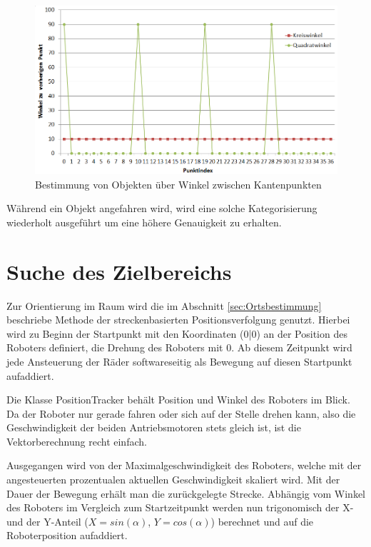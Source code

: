 \begin{figure}[h]
\centering
\includegraphics[width=\textwidth]{Bilder/Workloop/KreisQuadratWinkel}
\caption{Bestimmung von Objekten über Winkel zwischen Kantenpunkten}
\label{fig:KreisQuadratWinkel}
\end{figure}

Während ein Objekt angefahren wird, wird eine solche Kategorisierung wiederholt ausgeführt um eine höhere Genauigkeit zu erhalten.

\section{Suche des Zielbereichs}
\label{sec:Orientierung}

Zur Orientierung im Raum wird die im Abschnitt \ref{sec:Ortsbestimmung} beschriebe Methode der streckenbasierten Positionsverfolgung genutzt. Hierbei wird zu Beginn der Startpunkt mit den Koordinaten (0|0) an der Position des Roboters definiert, die Drehung des Roboters mit 0\degree. Ab diesem Zeitpunkt wird jede Ansteuerung der Räder  softwareseitig als Bewegung auf diesen Startpunkt aufaddiert. 

Die Klasse PositionTracker behält Position und Winkel des Roboters im Blick. Da der Roboter nur gerade fahren oder sich auf der Stelle drehen kann, also die Geschwindigkeit der beiden Antriebsmotoren stets gleich ist, ist die Vektorberechnung recht einfach.

Ausgegangen wird von der Maximalgeschwindigkeit des Roboters, welche mit der angesteuerten prozentualen aktuellen Geschwindigkeit skaliert wird. Mit der Dauer der Bewegung erhält man die zurückgelegte Strecke. Abhängig vom Winkel des Roboters im Vergleich zum Startzeitpunkt werden nun trigonomisch der X- und der Y-Anteil ($X=sin(\alpha)$, $Y=cos(\alpha)$) berechnet und auf die Roboterposition aufaddiert.

